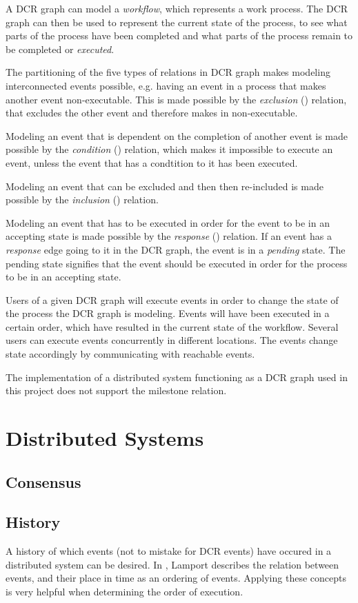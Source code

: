 	A DCR graph can model a \textit{workflow}, which represents a work process. The DCR graph can then be used to represent the current state of the process, to see what parts of the process have been completed and what parts of the process remain to be completed or \textit{executed}. 
	
	The partitioning of the five types of relations in DCR graph makes modeling interconnected events possible, e.g. having an event in a process that makes another event non-executable. This is made possible by the \textit{exclusion} (\exclusion) relation, that excludes the other event and therefore makes in non-executable. 
	
	Modeling an event that is dependent on the completion of another event is made possible by the \textit{condition} (\condition) relation, which makes it impossible to execute an event, unless the event that has a condtition to it has been executed.
	
	Modeling an event that can be excluded and then then re-included is made possible by the \textit{inclusion} (\inclusion) relation. 
	
	Modeling an event that has to be executed in order for the event to be in an accepting state  is made possible by the \textit{response} (\response) relation. If an event has a \textit{response} edge going to it in the DCR graph, the event is in a \textit{pending} state. The pending state signifies that the event should be executed in order for the process to be in an accepting state.
	
	Users of a given DCR graph will execute events in order to change the state of the process the DCR graph is modeling. Events will have been executed in a certain order, which have resulted in the current state of the workflow. Several users can execute events concurrently in different locations. The events change state accordingly by communicating with reachable events. 
	
	The implementation of a distributed system functioning as a DCR graph used in this project does not support the milestone relation. 
	\section{Distributed Systems}
		\subsection{Consensus}
		\subsection{History}
		A history of which events (not to mistake for DCR events) have occured in a distributed system can be desired. In \cite{Lamport:1978:TCO:359545.359563}, Lamport describes the relation between events, and their place in time as an ordering of events. Applying these concepts is very helpful when determining the order of execution. 
		
